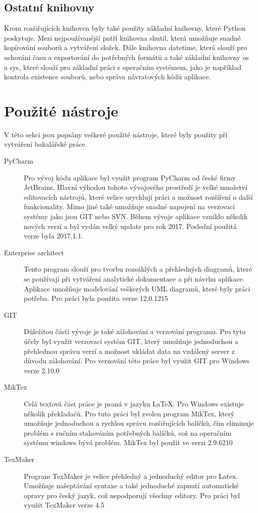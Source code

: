 \documentclass[thesis=B,czech]{resources/FITthesis}[2012/06/26]
\begin{document}
\subsection{Ostatní knihovny}
Krom rozšiřujících knihoven byly také použity základní knihovny, které Python poskytuje. Mezi nejpoužívanější patří knihovna shutil, která umožňuje snadné kopírování souborů a vytváření složek. Dále knihovna datetime, která slouží pro uchování času a exportování do potřebných formátů a také základní knihovny os a sys, které slouží pro základní práci s operačním systémem, jako je například kontrola existence souborů, nebo správa návratových kódů aplikace.



\section{Použité nástroje}
V této sekci jsou popsány veškeré použité nástroje, které byly použity při vytváření bakalářské práce.

\begin{description}
\item[PyCharm] Pro vývoj kódu aplikace byl využit program PyCharm od české firmy JetBrains. Hlavní výhodou tohoto vývojového prostředí je velké množství editovacích nástrojů, které velice urychlují práci a možnost rozšíření o další funkcionality. Mimo jiné také umožňuje snadné napojení na verzovací systémy jako jsou GIT nebo SVN. Během vývoje aplikace vzniklo několik nových verzí a byl vydán velký update pro rok 2017. Poslední použitá verze byla 2017.1.1.

\item[Enterprise architect] Tento program slouží pro tvorbu rozsáhlých a přehledných diagramů, které se používají při vytváření analytické dokumentace a při návrhu aplikace. Aplikace umožňuje modelování veškerých UML diagramů, které byly práci potřeba. Pro práci byla použita verze 12.0.1215

\item[GIT] Důležitou částí vývoje je také zálohování a verzování programu. Pro tyto účely byl využit verzovací systém GIT, který umožňuje jednoduchou a přehlednou správu verzí a možnost ukládat data na vzdálený server z důvodu zálohování. Pro verzování této práce byl využit GIT pro Windows verze 2.10.0

\item[MikTex] Celá textová část práce je psaná v jazyku \LaTeX. Pro Windows existuje několik překladačů. Pro tuto práci byl zvolen program MikTex, který umožňuje jednoduchou a rychlou správu rozšiřujících balíčků, čím eliminuje problém s ručním stahováním potřebných balíčků, což na operačním systému windows bývá problém. MikTex byl použit ve verzi 2.9.6210

\item[TexMaker] Program TexMaker je velice přehledný a jednoduchý editor pro Latex. Umožňuje našeptávání syntaxe a také jednoduché zapnutí automatické opravy pro český jazyk, což nepodporují všechny editory. Pro práci byl využit TexMaker verze 4.5
\end{description}
\end{document}
